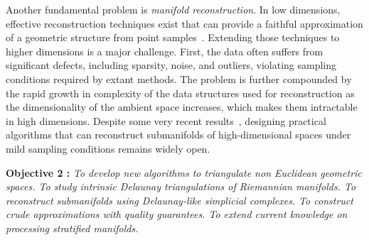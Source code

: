 Another fundamental problem is {\em manifold reconstruction}.  In low dimensions, effective reconstruction techniques exist that can provide a faithful approximation of a geometric structure from point samples~\cite{dey-csr-2007}. %
Extending those techniques to higher dimensions is a major challenge.  First, the data often suffers from significant defects, including sparsity, noise, and outliers, violating sampling conditions required by extant methods. The problem is further compounded by the rapid growth in complexity of the data structures used for reconstruction as the dimensionality of the ambient space increases, which makes them intractable in high dimensions. %
 Despite some very recent results~\cite{geometrica-7142i}, designing practical algorithms that can reconstruct submanifolds of high-dimensional spaces under mild sampling conditions remains widely open.  
\vspace{2mm}

{\bf Objective 2 :}  {\em To   develop new algorithms to {\em  triangulate non Euclidean geometric spaces}. To study intrinsic Delaunay triangulations of Riemannian manifolds.  To reconstruct submanifolds using Delaunay-like simplicial complexes. To construct crude approximations 
with quality guarantees. To extend current knowledge on processing stratified manifolds.}

